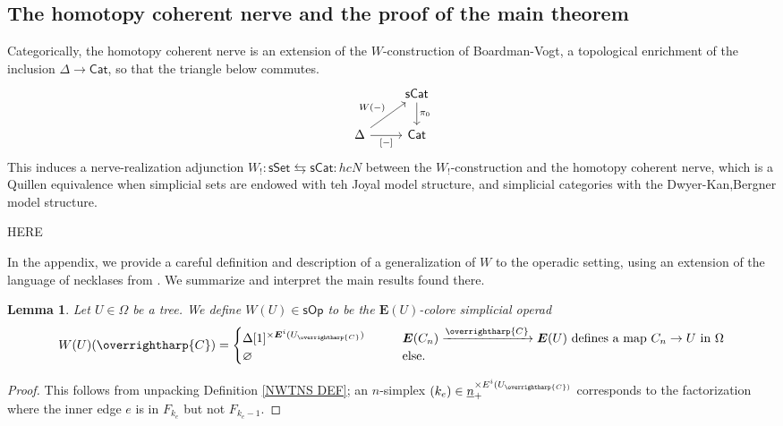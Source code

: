 \documentclass[a4paper,10pt
,draft
]{article}%
\numberwithin{equation}{section}
\numberwithin{figure}{section}
\newtheorem{lemma}[equation]{Lemma}%
\theoremstyle{definition} %
\newcommand{\vect}[1]{\text{\overrightharp{\ensuremath{#1}}}}
\newcommand{\sSet}{\ensuremath{\mathsf{sSet}}}%
\newcommand{\Cat}{\mathsf{Cat}}
\newcommand{\sCat}{\mathsf{sCat}}
\newcommand{\sOp}{\ensuremath{\mathsf{sOp}}}%
\newcommand{\1}{\ensuremath{\mathbbm 1}}%
\begin{document}
\subsection{The homotopy coherent nerve and the proof of the main theorem}

{\color{OliveGreen} %
  Categorically, the homotopy coherent nerve is an extension of the $W$-construction of Boardman-Vogt,
  a topological enrichment of the inclusion $\Delta \to \Cat$, so that the triangle below commutes.
  \[
        \begin{tikzcd}
              &
              \sCat \arrow[d, "\pi_0"]
              \\
              \Delta \arrow[r, "{[-]}"'] \arrow[ur, "W(-)"]
              &
              \Cat
        \end{tikzcd}
  \]
  This induces a nerve-realization adjunction $W_! \colon \sSet \leftrightarrows \sCat \colon hcN$
  between the $W_!$-construction and the homotopy coherent nerve,
  which is a Quillen equivalence when simplicial sets are endowed with teh Joyal model structure, and simplicial categories with the Dwyer-Kan,Bergner model structure.
} %

{\color{red} HERE}

In the appendix, we provide a careful definition and description of a generalization of $W$ to the operadic setting,
using an extension of the language of necklases from \cite{DS11}.
We summarize and interpret the main results found there.

\begin{lemma}
      Let $U \in \Omega$ be a tree. We define $W(U) \in \sOp$ to be the $\boldsymbol{E}(U)$-colore simplicial operad
      \begin{equation}
            \label{WU_EQ}
            W(U)(\vect C) =
            \begin{cases}
                  \Delta[1]^{\times \boldsymbol{E}^i(U_{\vect C})}
                  \qquad
                  & \mbox{$\boldsymbol{E}(C_n) \xrightarrow{\vect C} \boldsymbol{E}(U)$ defines a map $C_n \to U$ in $\Omega$}
                  \\
                  \varnothing & \mbox{else.}
            \end{cases}
      \end{equation}
\end{lemma}
\begin{proof}
      This follows from unpacking Definition \ref{NWTNS DEF};
      an $n$-simplex $(k_e) \in \underline{n}_+^{\times E^i(U_{\vect C)}}$ corresponds to the factorization where
      the inner edge $e$ is in $F_{k_e}$ but not $F_{k_e -1}$. 
\end{proof}
\end{document}
